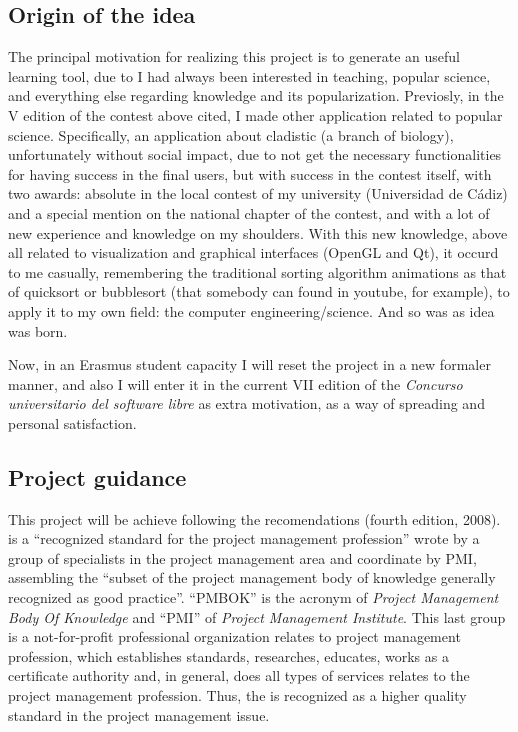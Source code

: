 \documentclass[twocolumn]{article}
\begin{document}
\subsection{Origin of the idea}
The principal motivation for realizing this project is to generate an
useful learning tool, due to I had always been interested in teaching,
popular science, and everything else regarding knowledge and its
popularization. Previosly, in the V edition of the contest above
cited, I made other application related
to popular science. Specifically, an application about cladistic (a branch
of biology), unfortunately without social impact, due to not get
the necessary functionalities for having success in the final users,
but with success in the contest itself, with two awards: absolute in
the local contest of my university (Universidad de Cádiz) and a
special mention on the national chapter
of the contest, and with a lot of new experience and knowledge on my
shoulders. With this new knowledge, above all related to visualization
and graphical interfaces (OpenGL and Qt), it occurd to me casually, remembering
the traditional sorting algorithm animations as that of quicksort or
bubblesort (that somebody can found in youtube, for example), to apply
it to my own field: the computer engineering/science. And so was as
\fav idea was born.

Now, in an Erasmus student capacity I will reset the project in a new
formaler manner, and also I will enter it in the current VII
edition of the \textit{Concurso universitario del software libre} as
extra motivation, as a way of spreading and personal satisfaction.

\subsection{Project guidance}
This project will be achieve following the \pmbok
recomendations (fourth edition, 2008). \pmbok is a ``recognized
standard for the
project management profession'' wrote by a group of specialists in the
project management area and coordinate by PMI, assembling the ``subset of
the project management body of knowledge generally recognized as good
practice''. ``PMBOK'' is the acronym of \textit{Project Management
  Body Of Knowledge} and ``PMI'' of \textit{Project Management
  Institute}. This last group is a not-for-profit professional
organization relates to project management profession, which
establishes standards, researches, educates, works as a certificate
authority and, in general, does all types of services relates to the
project management profession. Thus, the \pmbok is recognized as
a higher quality standard in the project management issue.
\end{document}
